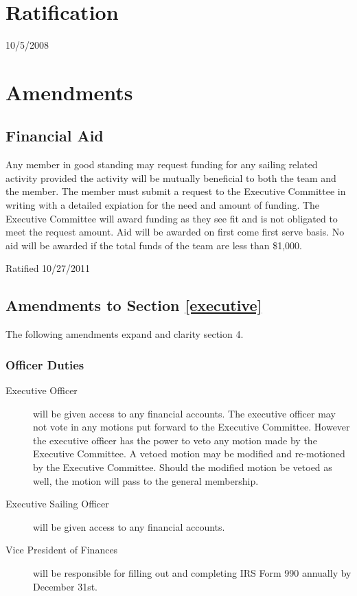 \documentclass[12pt,titlepage,letter]{article}
\begin{document}
\section{Ratification}
10/5/2008

\pagebreak

\section{Amendments}
\subsection{Financial Aid}
Any member in good standing may request funding for any sailing related activity provided the activity will be mutually beneficial to both the team and the member. The member must submit a request to the Executive Committee in writing with a detailed expiation for the need and amount of funding. The Executive Committee will award funding as they see fit and is not obligated to meet the request amount. Aid will be awarded on first come first serve basis. No aid will be awarded if the total funds of the team are less than \$1,000.

Ratified 10/27/2011

\subsection{Amendments to Section \ref{executive}}
The following amendments expand and clarity section 4.
\subsubsection{Officer Duties}
\begin{description}
\item[Executive Officer] will be given access to any financial accounts. The executive officer may not vote in any motions put forward to the Executive Committee. However the executive officer has the power to veto any motion made by the Executive Committee. A vetoed motion may be modified and re-motioned by the Executive Committee. Should the modified motion be vetoed as well, the motion will pass to the general membership.
\item[Executive Sailing Officer] will be given access to any financial accounts.
\item[Vice President of Finances] will be responsible for filling out and completing IRS Form 990 annually by December 31st.
\end{description}
\end{document}
